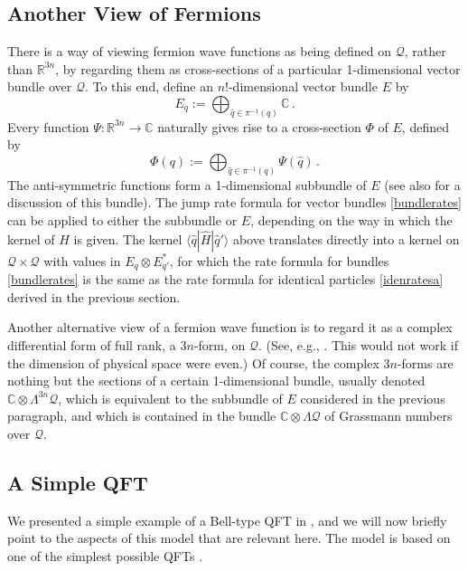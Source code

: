 \documentclass[12pt]{article}
\newcommand{\CCC}{\mathbb{C}} %
\newcommand{\RRR}{\mathbb{R}} %
\newcommand{\1}{\mathbf{1}} %
\renewcommand{\sp}[2]{\langle #1 | #2 \rangle} %
\newcommand{\conf}{\mathcal{Q}} %
\newcommand{\covering}{\pi} %
\begin{document}
\subsection{Another View of Fermions}

There is a way of viewing fermion wave functions as being defined on
$\conf$, rather than $\RRR^{3n}$, by regarding  them as cross-sections 
of
a particular 1-dimensional vector bundle over $\conf$. To this end,
define an $n!$-dimensional vector bundle $E$ by
\begin{equation}\label{idenEdef}
   E_q := \bigoplus_{\hat{q} \in \covering^{-1}(q)} \CCC\,.
\end{equation}
Every function $\Psi:\RRR^{3n} \to \CCC$ naturally gives rise to a
cross-section $\Phi$ of $E$, defined by
\begin{equation}
   \Phi(q) := \bigoplus_{\hat{q} \in \covering^{-1}(q)} \Psi(\hat{q})\,.
\end{equation}
The anti-symmetric functions form a 1-dimensional subbundle of $E$
(see also \cite{identical} for a discussion of this bundle).  The jump
rate formula for vector bundles \eqref{bundlerates} can be applied to
either the subbundle or $E$, depending on the way in which the kernel
of $H$ is given. The kernel $\sp{\hat{q}} {\hat{H}| \hat{q}'}$ above
translates directly into a kernel on $\conf \times \conf$ with values
in $E_q \otimes E^*_{q'}$, for which the rate formula for bundles
\eqref{bundlerates} is the same as the rate formula for identical
particles \eqref{idenratesa} derived in the previous section.

Another alternative view of a fermion wave function is to regard it as
a complex differential form of full rank, a $3n$-form, on
$\conf$. (See, e.g., \cite{identical}.  This would not work if the
dimension of physical space were even.) Of course, the complex
$3n$-forms are nothing but the sections of a certain 1-dimensional
bundle, usually denoted $\CCC\otimes \Lambda^{3n} \conf$, which is
equivalent to the subbundle of $E$ considered in the previous
paragraph, and which is contained in the bundle $\CCC \otimes \Lambda
\conf$ of Grassmann numbers over $\conf$.

\subsection{A Simple QFT}\label{sec:crea1}

We presented a simple example of a Bell-type QFT in \cite{crea1},
and we will now briefly point to the aspects of this model that are
relevant here. The model is based on one of the simplest possible QFTs
\cite[p.~339]{Schweber}.
\end{document}
